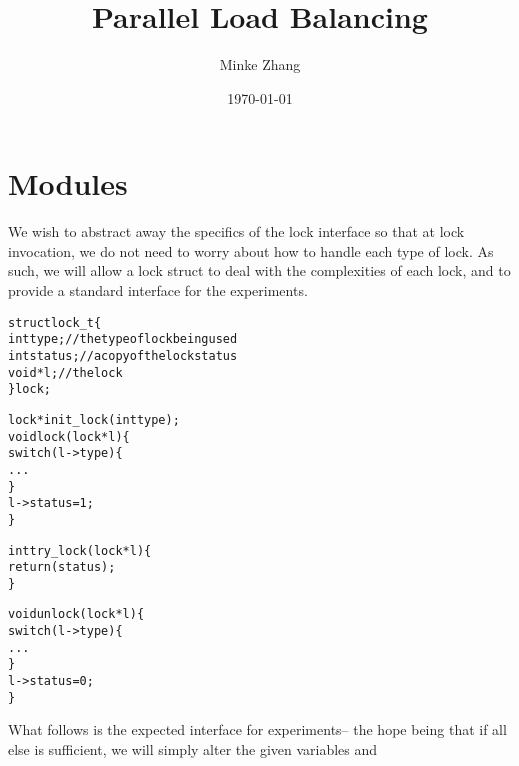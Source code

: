 \documentclass{article}
\newcommand{\tb}[1]{\textbf{#1}}
\newcommand{\cpart}[1]{\newblock{\LARGE {\\\\#1}}}
\begin{document}

\title{\tb{Parallel Load Balancing}}
\author{Minke Zhang\hspace*{-\tabcolsep}}
\date{\today}

\begingroup
\let\center\flushright
\let\endcenter\endflushright
\maketitle
\endgroup

\section{Modules}

\cpart{Locks}

We wish to abstract away the specifics of the lock interface so that at lock invocation, we do not need to worry about how to handle each type of lock. As such, we 
will allow a lock struct to deal with the complexities of each lock, and to provide a standard interface for the experiments.

\begin{alltt}
struct lock_t \{
  int type;             // the type of lock being used
  int status;           // a copy of the lock status
  void *l;              // the lock
\} lock;

lock *init_lock(int type);
void lock(lock *l) \{
  switch(l->type) \{
    ...
  \}
  l->status = 1;
\}

int try_lock(lock *l) \{
  return(status);
\}

void unlock(lock *l) \{
  switch(l->type) \{
    ...
  \}
  l->status = 0;
\}
\end{alltt}

\cpart{Experiment Interfaces}

What follows is the expected interface for experiments-- the hope being that if all else is sufficient, we will simply alter the given variables and
\end{document}
